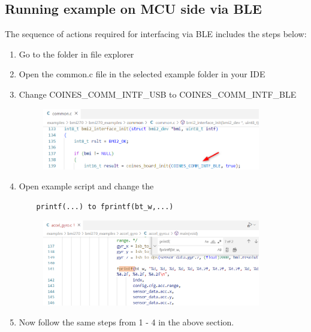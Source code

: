 \documentclass{article}
\begin{document}
\begin{enumerate}
\begin{figure}[H]
\begin{center}
		\end{center}
	\end{figure}
\end{enumerate}
\subsection{Running example on MCU side via BLE}
The sequence of actions required for interfacing via BLE includes the steps below:
\begin{enumerate}
	\item Go to the  folder in file explorer
	\item Open the common.c file in the selected example folder in your IDE
	\item Change COINES\_COMM\_INTF\_USB  to COINES\_COMM\_INTF\_BLE
	\begin{figure}[H]
		\begin{center}
			\includegraphics[width=0.9\textwidth]{coinesAPI_images/Mcu_example_ble_intf.png}
		\end{center}
	\end{figure}
	\item Open example script and change the 
	\begin{verbatim}
	printf(...) to fprintf(bt_w,...)
	\end{verbatim}
	\begin{figure}[H]
		\begin{center}
			\includegraphics[width=0.9\textwidth]{coinesAPI_images/Mcu_example_ble_print.png}
		\end{center}
	\end{figure}
	\item Now follow the same steps from 1 - 4 in the above section.

\end{enumerate}
\end{document}
